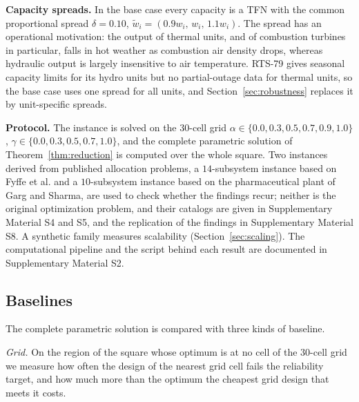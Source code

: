 \documentclass[Review,sagev,times]{sagej}%
\begin{document}
\textbf{Capacity spreads.} In the base case every capacity is a TFN with the common proportional spread
$\delta=0.10$, $\tilde{w}_i=(0.9w_i,\,w_i,\,1.1w_i)$. The spread has an operational motivation: the output of
thermal units, and of combustion turbines in particular, falls in hot weather as combustion air density drops,
whereas hydraulic output is largely insensitive to air temperature. RTS-79 gives seasonal capacity limits for its
hydro units but no partial-outage data for thermal units, so the base case uses one spread for all units, and
Section~\ref{sec:robustness} replaces it by unit-specific spreads.

\textbf{Protocol.} The instance is solved on the $30$-cell grid $\alpha\in\{0.0,\allowbreak 0.3,\allowbreak 0.5,\allowbreak 0.7,\allowbreak 0.9,\allowbreak 1.0\}$,
$\gamma\in\{0.0,\allowbreak 0.3,\allowbreak 0.5,\allowbreak 0.7,\allowbreak 1.0\}$, and the complete parametric
solution of Theorem~\ref{thm:reduction} is computed over the whole square. Two instances derived from published
allocation problems, a $14$-subsystem instance based on Fyffe et al.\cite{Fyffe1968} and a $10$-subsystem
instance based on the pharmaceutical plant of Garg and Sharma\cite{Garg2013}, are used to check whether the
findings recur; neither is the original optimization problem, and their catalogs are given in
Supplementary Material S4 and S5, and the replication of the findings in Supplementary Material S8. A synthetic family measures scalability (Section~\ref{sec:scaling}). The
computational pipeline and the script behind each result are documented in Supplementary Material S2.

\subsection{Baselines} \label{sec:baselines_def}
The complete parametric solution is compared with three kinds of baseline.

\emph{Grid.} On the region of the square whose optimum is at no cell of the $30$-cell grid we measure how often
the design of the nearest grid cell fails the reliability target, and how much more than the optimum the
cheapest grid design that meets it costs.
\end{document}
